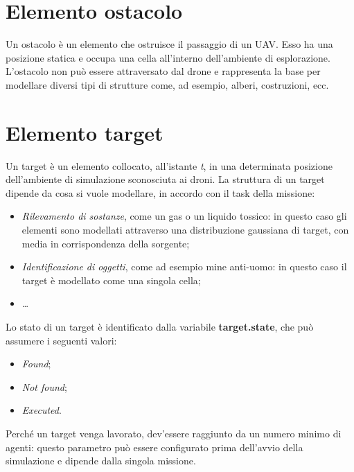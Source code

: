 \section{Elemento ostacolo}

Un ostacolo è un elemento che ostruisce il passaggio di un UAV. 
Esso ha una posizione statica e occupa una cella all’interno dell’ambiente di esplorazione. 
L’ostacolo non può essere attraversato dal drone e rappresenta la base per modellare diversi tipi di strutture come, ad esempio, alberi, costruzioni, ecc.

\section {Elemento target} \label{elemento_target}

Un target è un elemento collocato, all'istante \textit{t}, in una determinata posizione dell’ambiente di simulazione sconosciuta ai droni. 
La struttura di un target dipende da cosa si vuole modellare, in accordo con il task della missione:

\begin{itemize}
    \item \textit{Rilevamento di sostanze}, come un gas o un liquido tossico: in questo caso gli elementi sono modellati attraverso una distribuzione gaussiana di target, con media in corrispondenza della sorgente;
    \item \textit{Identificazione di oggetti}, come ad esempio mine anti-uomo: in questo caso il target è modellato come una singola cella;
    \item \dots
\end{itemize}

Lo stato di un target è identificato dalla variabile \textbf{target.state}, che può assumere i seguenti valori:

\begin{itemize}
    \item \textit{Found};
    \item \textit{Not found};
    \item \textit{Executed}.
\end{itemize}

Perché un target venga lavorato, dev'essere raggiunto da un numero minimo di agenti: questo parametro può essere configurato prima dell'avvio della simulazione e dipende dalla singola missione.


